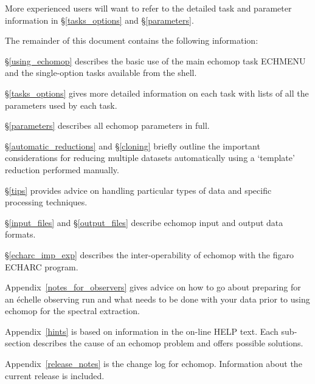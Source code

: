 \documentclass[twoside,11pt]{article}
\newcommand{\htmlref}[2]{#1}
\newcommand{\xref}[3]{#1}
\renewcommand{\_}{\texttt{\symbol{95}}}
\newcommand{\sunspec}[2]{#1}
\newcommand{\sunspec}[2]{#2}
\begin{document}
More experienced users will want to refer to the detailed task and parameter
information
\sunspec{in \S\ref{tasks_options}}{under \htmlref{Tasks}{tasks_options}}
and \sunspec{\S\ref{parameters}}{\htmlref{Parameters}{parameters}}\@.

The remainder of this document contains the following information:

\sunspec{\S\ref{using_echomop}}{\htmlref{Using
{\sc echomop}}{using_echomop}} describes the basic use of the main
{\sc echomop} task ECHMENU and the single-option tasks available from the shell.

\sunspec{\S\ref{tasks_options}}{\htmlref{Tasks \&
Options}{tasks_options}} gives more detailed information on each task
with lists of all the parameters used by each task.

\sunspec{\S\ref{parameters}}{\htmlref{Parameters}{parameters}}
describes all {\sc echomop} parameters in full.

\sunspec{\S\ref{automatic_reductions} and \S\ref{cloning}}{
\htmlref{Automatic Reductions}{automatic_reductions} and
\htmlref{Cloning}{cloning}} briefly
outline the important considerations for reducing multiple datasets
automatically using a `template' reduction performed manually.

\sunspec{\S\ref{tips}}{The \htmlref{Tips}{tips} section}
provides advice on handling particular types of data and specific processing
techniques.

\sunspec{\S\ref{input_files} and \S\ref{output_files}}{The
sections on
\htmlref{Input Data}{input_data} and \htmlref{Output Data}{output_data}}
describe {\sc echomop} input and output data formats.

\sunspec{\S\ref{echarc_imp_exp}}{\htmlref{ECHARC}{echarc_imp_exp}}
describes the inter-operability of
{\sc echomop} with the \xref{{\sc figaro}}{sun86}{} \xref{ECHARC}{sun86}{ECHARC} program.

\sunspec{Appendix~\ref{notes_for_observers}}{The \htmlref{Notes for
Observers}{notes_for_observers}} gives advice on how to go about
preparing for an \'{e}chelle observing run and what needs to be done
with your data prior to using {\sc echomop} for the spectral extraction.

\sunspec{Appendix~\ref{hints} is}
{The \htmlref{Hints}{hints} are}
based on information in the on-line HELP text.
Each sub-section describes the cause of an {\sc echomop} problem and offers
possible solutions.

\sunspec{Appendix~\ref{release_notes} is}
{The \htmlref{Release Notes}{release_notes} are} the change log for
{\sc echomop}.  Information about the current release is included.
\end{document}
